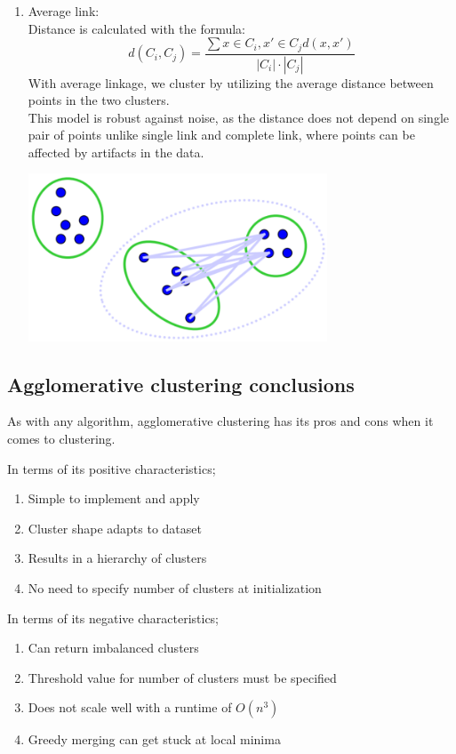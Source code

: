 \documentclass{article}
\begin{document}
\begin{enumerate}
	\item Average link:\\
	Distance is calculated with the formula:
	\begin{equation}
	    d(C_i,C_j) = \frac{\sum x \in C_i,x' \in C_j d(x,x')}{|C_i|\cdot |C_j|}
    \end{equation}
    With average linkage, we cluster by utilizing the average distance between points in the two clusters.\\
    This model is robust against noise, as the distance does not depend on single pair of points unlike single link and complete link, where points can be affected by artifacts in the data.
    \begin{center}
        \includegraphics[width=0.70\textwidth]{average.png}
    \end{center}
\end{enumerate}

\subsection{Agglomerative clustering conclusions}
As with any algorithm, agglomerative clustering has its pros and cons when it comes to clustering. 

In terms of its positive characteristics;
\begin{enumerate}
	\item Simple to implement and apply
	\item Cluster shape adapts to dataset
	\item Results in a hierarchy of clusters
	\item No need to specify number of clusters at initialization
\end{enumerate}

In terms of its negative characteristics;
\begin{enumerate}
	\item Can return imbalanced clusters
	\item Threshold value for number of clusters must be specified
	\item Does not scale well with a runtime of $O(n^3)$
	\item Greedy merging can get stuck at local minima
\end{enumerate}
\end{document}
